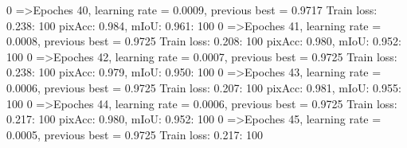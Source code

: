   0%
=>Epoches 40, learning rate = 0.0009,                 previous best = 0.9717
Train loss: 0.238: 100%
pixAcc: 0.984, mIoU: 0.961: 100%
  0%
=>Epoches 41, learning rate = 0.0008,                 previous best = 0.9725
Train loss: 0.208: 100%
pixAcc: 0.980, mIoU: 0.952: 100%
  0%
=>Epoches 42, learning rate = 0.0007,                 previous best = 0.9725
Train loss: 0.238: 100%
pixAcc: 0.979, mIoU: 0.950: 100%
  0%
=>Epoches 43, learning rate = 0.0006,                 previous best = 0.9725
Train loss: 0.207: 100%
pixAcc: 0.981, mIoU: 0.955: 100%
  0%
=>Epoches 44, learning rate = 0.0006,                 previous best = 0.9725
Train loss: 0.217: 100%
pixAcc: 0.980, mIoU: 0.952: 100%
  0%
=>Epoches 45, learning rate = 0.0005,                 previous best = 0.9725
Train loss: 0.217: 100%
